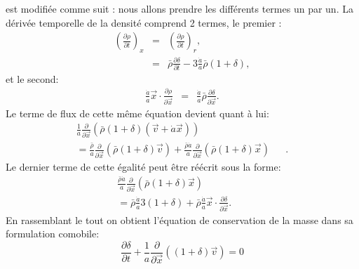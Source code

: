   est modifiée comme suit : nous allons prendre les différents termes un par un. La dérivée temporelle de la densité comprend 2 termes, le premier :
 \begin{eqnarray}
  \left(\frac{\partial \rho}{\partial t}\right)_x&=& \left(\frac{\partial \rho}{\partial t}\right)_r,\\
  &=&\bar \rho\frac{\partial \delta}{\partial t} -3\frac{\dot a}{a}\bar \rho (1+\delta),
 \end{eqnarray}
et le second:
\begin{eqnarray}
\frac{\dot a}{a}\vec x \cdot \frac{\partial \rho}{\partial \vec x}&=&\frac{\dot a }{a}\bar \rho \frac{\partial\delta}{\partial \vec x}.
\end{eqnarray}
Le terme de flux de cette même équation devient quant à lui:
\begin{eqnarray}
\frac{1}{a}\frac{\partial}{\partial \vec x}(\bar \rho(1+\delta)(\vec v + \dot a \vec x))&&\\
=\frac{\bar \rho}{a} \frac{\partial}{\partial \vec x}(\bar \rho(1+\delta)\vec v) + \frac{\bar \rho \dot a}{a} \frac{\partial}{\partial \vec x}(\bar \rho(1+\delta)\vec x)&&.
\end{eqnarray}
Le dernier terme de cette égalité peut être réécrit sous la forme:
\begin{eqnarray}
\frac{\bar \rho \dot a}{a} \frac{\partial}{\partial \vec x}(\bar \rho(1+\delta)\vec x)&&\\
=\bar \rho \frac{\dot a }{a} 3(1+\delta) +\bar \rho \frac{\dot a }{a} \vec x \cdot \frac{\partial \delta}{\partial \vec x}.
\end{eqnarray}
En rassemblant le tout on obtient l'équation de conservation de la masse dans sa formulation comobile:
\begin{equation}
\frac{\partial \delta}{\partial t}+\frac{1}{a}\frac{\partial}{\partial \vec x}((1+\delta)\vec v)=0
\end{equation}

